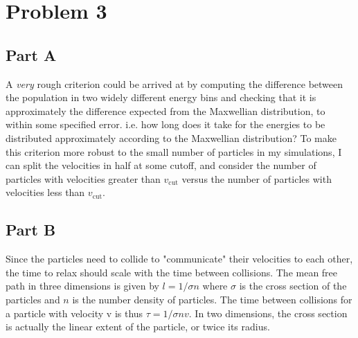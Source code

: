\documentclass[a4paper, 11pt]{article}
\begin{document}
\section*{Problem 3}
	\subsection*{Part A}
		A \emph{very} rough criterion could be arrived at by computing the difference between the population in two 
		widely different energy bins and checking that it is approximately the difference expected from the Maxwellian 
		distribution, to within some specified error. i.e. how long does it take for the energies to be distributed approximately 
		according to the Maxwellian distribution? To make this criterion more robust to the small number of particles in my 
		simulations, I can split the velocities in half at some cutoff, and consider the number of particles with velocities 
		greater than $v_\text{cut}$ versus the number of particles with velocities less than $v_\text{cut}$. 
	\subsection*{Part B}
		Since the particles need to collide to "communicate" their velocities to each other, the time to relax should scale with 
		the time between collisions. The mean free path in three dimensions is given by $l=1/\sigma n$ where $\sigma$ is 
		the cross section of the 
		particles and $n$ is the number density of particles. The time between collisions for a particle with velocity v is thus $
		\tau = 1/\sigma n v$. In two dimensions, the cross section is actually the linear extent of the particle, or twice its radius. 
\end{document}
